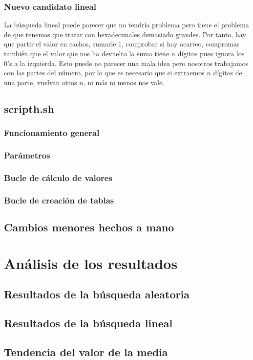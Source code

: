 \documentclass[a4paper, 11pt]{article}
\begin{document}
		\subsubsection{Nuevo candidato lineal}
			La búsqueda lineal puede parecer que no tendría problema pero tiene el problema de que tenemos que tratar con
			hexadecimales demasiado grandes. Por tanto, hay que partir el valor en cachos, sumarle 1, comprobar si hay acarreo,
			compromar también que el valor que nos ha devuelto la suma tiene $n$ dígitos pues ignora los 0's a la izquierda.
			Esto puede no parecer una mala idea pero nosotros trabajamos con las partes del número, por lo que es necesario
			que si extraemos $n$ dígitos de una parte, vuelvan otros $n$, ni más ni menos nos vale.
		
	\subsection{scripth.sh}
	
		\subsubsection{Funcionamiento general}
		\subsubsection{Parámetros}
		\subsubsection{Bucle de cálculo de valores}
		\subsubsection{Bucle de creación de tablas}

	\subsection{Cambios menores hechos a mano}

\section{Análisis de los resultados}
	\subsection{Resultados de la búsqueda aleatoria}
	\subsection{Resultados de la búsqueda lineal}
	\subsection{Tendencia del valor de la media}
\end{document}
